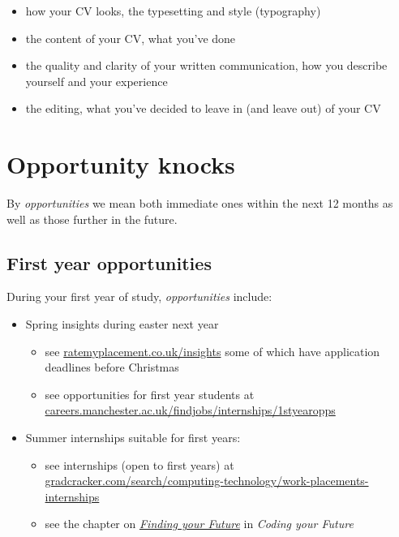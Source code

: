 \documentclass[
]{book}
\providecommand{\tightlist}{%
  \setlength{\itemsep}{0pt}\setlength{\parskip}{0pt}}
\begin{document}
\begin{itemize}
\tightlist
\item
  how your CV looks, the typesetting and style (typography)
\item
  the content of your CV, what you've done
\item
  the quality and clarity of your written communication, how you describe yourself and your experience
\item
  the editing, what you've decided to leave in (and leave out) of your CV
\end{itemize}

\hypertarget{knocking}{%
\section{Opportunity knocks}\label{knocking}}

By \emph{opportunities} we mean both immediate ones within the next 12 months as well as those further in the future.

\hypertarget{startearly}{%
\subsection{First year opportunities}\label{startearly}}

During your first year of study, \emph{opportunities} include:

\begin{itemize}
\tightlist
\item
  Spring insights during easter next year

  \begin{itemize}
  \tightlist
  \item
    see \href{https://www.ratemyplacement.co.uk/insights}{ratemyplacement.co.uk/insights} some of which have application deadlines before Christmas
  \item
    see opportunities for first year students at \href{https://www.careers.manchester.ac.uk/findjobs/internships/1styearopps/}{careers.manchester.ac.uk/findjobs/internships/1styearopps}
  \end{itemize}
\item
  Summer internships suitable for first years:

  \begin{itemize}
  \tightlist
  \item
    see internships (open to first years) at \href{https://www.gradcracker.com/search/computing-technology/work-placements-internships?duration=Summer\%20-\%20open\%20to\%201st\%20years}{gradcracker.com/search/computing-technology/work-placements-internships}
  \item
    see the chapter on \emph{\href{https://www.cdyf.me/finding.html}{Finding your Future}} in \emph{Coding your Future} \citep{findingyourfuture}
  \end{itemize}
\end{itemize}
\end{document}
